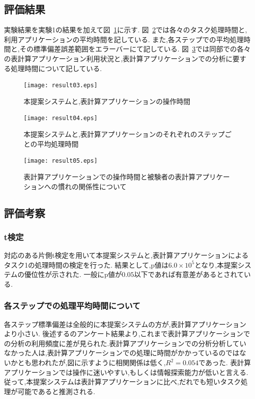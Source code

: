 \documentclass[sotsuron]{kuee}
\begin{document}
		\subsection{評価結果}
			実験結果を実験1の結果を加えて図~\ref{fig:result03}に示す.
			図~\ref{fig:result04}では各々のタスク処理時間と,利用アプリケーションの平均時間を記している.
			また,各ステップでの平均処理時間と,その標準偏差誤差範囲をエラーバーにて記している.
			図~\ref{fig:result05}では同部での各々の表計算アプリケーション利用状況と,表計算アプリケーションでの分析に要する処理時間について記している.
			\begin{figure}
				\begin{center}
					\texttt{[image: result03.eps]}
				\end{center}
				\caption{本提案システムと,表計算アプリケーションの操作時間}
		  		\label{fig:result03}
			\end{figure}
			\begin{figure}
				\begin{center}
					\texttt{[image: result04.eps]}
				\end{center}
				\caption{本提案システムと,表計算アプリケーションのそれぞれのステップごとの平均処理時間}
		  		\label{fig:result04}
			\end{figure}
			\begin{figure}
				\begin{center}
					\texttt{[image: result05.eps]}
				\end{center}
				\caption{表計算アプリケーションでの操作時間と被験者の表計算アプリケーションへの慣れの関係性について}
		  		\label{fig:result05}
			\end{figure}
		\subsection{評価考察}
			\subsubsection{t検定}
				対応のある片側t検定を用いて本提案システムと,表計算アプリケーションによるタスク1の処理時間の検定を行った.
				結果として,p値は$6.0 \times 10^5$となり,本提案システムの優位性が示された.
				一般にp値が$0.05$以下であれば有意差があるとされている.
			\subsubsection{各ステップでの処理平均時間について}
				各ステップ標準偏差は全般的に本提案システムの方が,表計算アプリケーションより小さい.
				後述するのアンケート結果より,これまで表計算アプリケーションでの分析の利用頻度に差が見られた.表計算アプリケーションでの分析分析していなかった人は,表計算アプリケーションでの処理に時間がかかっているのではないかとも思われたが,図に示すように相関関係は低く,$R^2 = 0.054$であった.
				表計算アプリケーションでは操作に迷いやすい,もしくは情報探索能力が低いと言える.
				従って,本提案システムは表計算アプリケーションに比べ,だれでも短いタスク処理が可能であると推測される.
\end{document}
